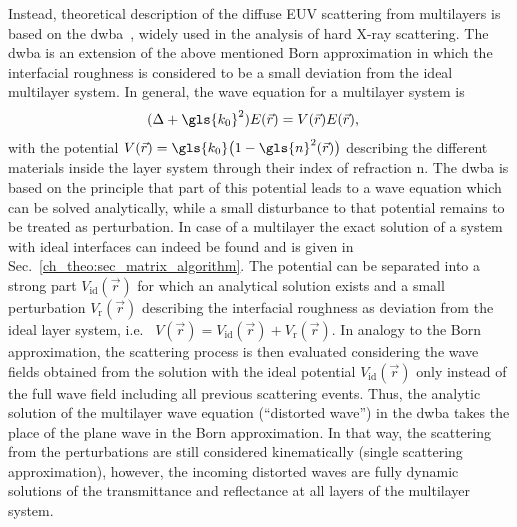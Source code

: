 Instead, theoretical description of the diffuse EUV scattering from multilayers is based on the \gls{dwba}~\cite{holy_nonspecular_1994,holy_x-ray_1993}, widely used in the analysis of hard X-ray scattering. The \gls{dwba} is an extension of the above mentioned Born approximation in which the interfacial roughness is considered to be a small deviation from the ideal multilayer system. In general, the wave equation for a multilayer system is
\begin{align}
        (\Delta + \gls{k_0}^2) E(\vec{r}) &= V(\vec{r}) E(\vec{r})\text{,} \label{ch_theo:eqn_multilayer_wave_equation} 
\end{align}
with the potential $V(\vec{r}) = \gls{k_0}\big(1-\gls{n}^2(\vec{r})\big)$ \cite{pietsch_high-resolution_2004} describing the different materials inside the layer system through their index of refraction \gls{n}. The \gls{dwba} is based on the principle that part of this potential leads to a wave equation which can be solved analytically, while a small disturbance to that potential remains to be treated as perturbation. In case of a multilayer the exact solution of a system with ideal interfaces can indeed be found and is given in Sec.~\ref{ch_theo:sec_matrix_algorithm}. The potential can be separated into a strong part $V_\text{id}(\vec{r})$ for which an analytical solution exists and a small perturbation $V_\text{r}(\vec{r})$ describing the interfacial roughness as deviation from the ideal layer system, i.e.~  $V(\vec{r}) = V_\text{id}(\vec{r}) + V_\text{r}(\vec{r})$. In analogy to the Born approximation, the scattering process is then evaluated considering the wave fields obtained from the solution with the ideal potential $V_\text{id}(\vec{r})$ only instead of the full wave field including all previous scattering events. Thus, the analytic solution of the multilayer wave equation (``distorted wave'') in the \gls{dwba} takes the place of the plane wave in the Born approximation. In that way, the scattering from the perturbations are still considered kinematically (single scattering approximation), however, the incoming distorted waves are fully dynamic solutions of the transmittance and reflectance at all layers of the multilayer system.





